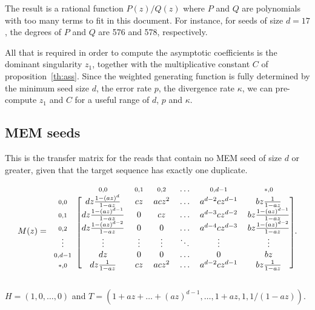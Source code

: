 \documentclass{article}
\begin{document}
The result is a rational function
$P(z)/Q(z)$ where $P$ and $Q$ are polynomials with too many terms to fit
in this document. For instance, for seeds of size $d=17$, the degrees of
$P$ and $Q$ are 576 and 578, respectively.

All that is required in order to compute the asymptotic coefficients is
the dominant singularity $z_1$, together with the multiplicative constant
$C$ of proposition~\ref{th:ass}. Since the weighted generating function is
fully determined by the minimum seed size $d$, the error rate $p$, the
divergence rate  $\kappa$, we can pre-compute $z_1$ and $C$ for a useful
range of $d$, $p$ and $\kappa$.



\subsection{MEM seeds}

This is the transfer matrix for the reads that contain no MEM seed of size
$d$ or greater, given that the target sequence has exactly one duplicate.

\begin{equation*}
M(z) =
\begin{blockarray}{ccccccc}
   & \scriptstyle{0,0} & \scriptstyle{0,1} & \scriptstyle{0,2}
   & \ldots & \scriptstyle{0,d-1} & \scriptstyle{*,0} \\
\begin{block}{c[cccccc]}
\scriptstyle{0,0} & dz\frac{1-(az)^d}{1-az} &
    cz & acz^2 & \ldots & a^{d-2}cz^{d-1} & bz\frac{1}{1-az} \\
\scriptstyle{0,1} & dz \frac{1-(az)^{d-1}}{1-az} & 0 & cz &
    \ldots & a^{d-3}cz^{d-2} & bz\frac{1-(az)^{d-1}}{1-az} \\
\scriptstyle{0,2} & dz\frac{1-(az)^{d-2}}{1-az} & 0 & 0 &
    \ldots & a^{d-4}cz^{d-3} & bz\frac{1-(az)^{d-2}}{1-az}  \\
\vdots & \vdots & \vdots & \vdots & \ddots & \vdots & \vdots \\
\scriptstyle{0,d-1} & dz & 0 & 0 & \ldots & 0 & bz \\
\scriptstyle{*,0} & dz\frac{1}{1-az} & cz & acz^2 &
    \ldots & a^{d-2}cz^{d-1} & bz\frac{1}{1-az} \\
\end{block}
\end{blockarray}.
\end{equation*}

$H=(1,0,\ldots,0)$ and $T=(1+az+\ldots+(az)^{d-1}, \ldots, 1+az, 1,
1/(1-az))$.
\end{document}

